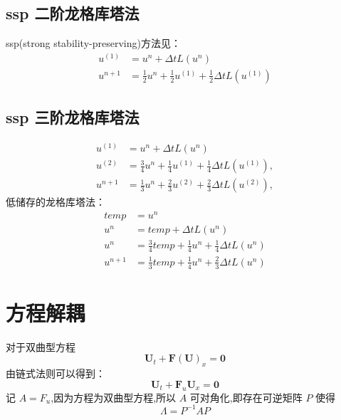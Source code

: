 \documentclass{book}
\begin{document}
\begin{example}
\begin{example}{}{}
\begin{example}
\begin{example}
\begin{example}
\subsection{ssp 二阶龙格库塔法}
ssp(strong stability-preserving)方法见：\cite{RN96}
\begin{equation}
    \begin{aligned}
        u^{(1)} & =u^{n}+\Delta t L\left(u^{n}\right)                                               \\
        u^{n+1} & =\frac{1}{2} u^{n}+\frac{1}{2} u^{(1)}+\frac{1}{2} \Delta t L\left(u^{(1)}\right)
    \end{aligned}
\end{equation}
\subsection{ssp 三阶龙格库塔法}
\begin{equation}
    \begin{aligned}
        u^{(1)} & =u^{n}+\Delta t L\left(u^{n}\right)                                                \\
        u^{(2)} & =\frac{3}{4} u^{n}+\frac{1}{4} u^{(1)}+\frac{1}{4} \Delta t L\left(u^{(1)}\right), \\
        u^{n+1} & =\frac{1}{3} u^{n}+\frac{2}{3} u^{(2)}+\frac{2}{3} \Delta t L\left(u^{(2)}\right),
    \end{aligned}
\end{equation}
低储存的龙格库塔法：
\begin{equation}
    \begin{aligned}
        temp    & = u^n                                                       \\
        u^n     & = temp +\Delta t L\left(u^{n}\right)                        \\
        u^n     & = \frac{3}{4}temp+\frac{1}{4}u^n+\frac{1}{4}\Delta t L(u^n) \\
        u^{n+1} & = \frac{1}{3}temp+\frac{1}{4}u^n+\frac{2}{3}\Delta t L(u^n)
    \end{aligned}
\end{equation}
\section{方程解耦}
对于双曲型方程
\begin{equation}
    \mathbf{U}_{t}+\mathbf{F}(\mathbf{U})_{x}=\mathbf{0}
\end{equation}
由链式法则可以得到：
\begin{equation}
    \mathbf{U}_{t}+\mathbf{F}_u\mathbf{U}_{x}=\mathbf{0}
\end{equation}
记 $A=F_u$,因为方程为双曲型方程,所以 $A$ 可对角化,即存在可逆矩阵 $P$ 使得
\begin{equation}
    \Lambda = P^{-1}AP
\end{equation}


\end{example}
\end{example}
\end{example}
\end{example}
\end{example}
\end{document}
